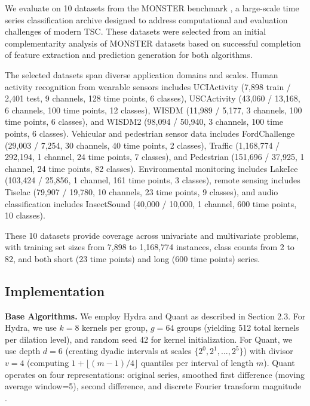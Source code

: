 \documentclass[pdflatex,sn-basic]{sn-jnl}           %
\theoremstyle{thmstyleone}%
\theoremstyle{thmstyletwo}%
\theoremstyle{thmstylethree}%
\begin{document}
We evaluate on 10 datasets from the MONSTER benchmark \citep{monster}, a large-scale time series classification archive designed to address computational and evaluation challenges of modern TSC. These datasets were selected from an initial complementarity analysis of MONSTER datasets based on successful completion of feature extraction and prediction generation for both algorithms.

The selected datasets span diverse application domains and scales. Human activity recognition from wearable sensors includes UCIActivity (7,898 train / 2,401 test, 9 channels, 128 time points, 6 classes), USCActivity (43,060 / 13,168, 6 channels, 100 time points, 12 classes), WISDM (11,989 / 5,177, 3 channels, 100 time points, 6 classes), and WISDM2 (98,094 / 50,940, 3 channels, 100 time points, 6 classes). Vehicular and pedestrian sensor data includes FordChallenge (29,003 / 7,254, 30 channels, 40 time points, 2 classes), Traffic (1,168,774 / 292,194, 1 channel, 24 time points, 7 classes), and Pedestrian (151,696 / 37,925, 1 channel, 24 time points, 82 classes). Environmental monitoring includes LakeIce (103,424 / 25,856, 1 channel, 161 time points, 3 classes), remote sensing includes Tiselac (79,907 / 19,780, 10 channels, 23 time points, 9 classes), and audio classification includes InsectSound (40,000 / 10,000, 1 channel, 600 time points, 10 classes).

These 10 datasets provide coverage across univariate and multivariate problems, with training set sizes from 7,898 to 1,168,774 instances, class counts from 2 to 82, and both short (23 time points) and long (600 time points) series.

\subsection{Implementation}\label{subsec:implementation}

\textbf{Base Algorithms.} We employ Hydra and Quant as described in Section 2.3. For Hydra, we use $k=8$ kernels per group, $g=64$ groups (yielding 512 total kernels per dilation level), and random seed 42 for kernel initialization. For Quant, we use depth $d=6$ (creating dyadic intervals at scales $\{2^0, 2^1, ..., 2^5\}$) with divisor $v=4$ (computing $1 + \lfloor (m-1)/4 \rfloor$ quantiles per interval of length $m$). Quant operates on four representations: original series, smoothed first difference (moving average window=5), second difference, and discrete Fourier transform magnitude \citep{quant}.
\end{document}
